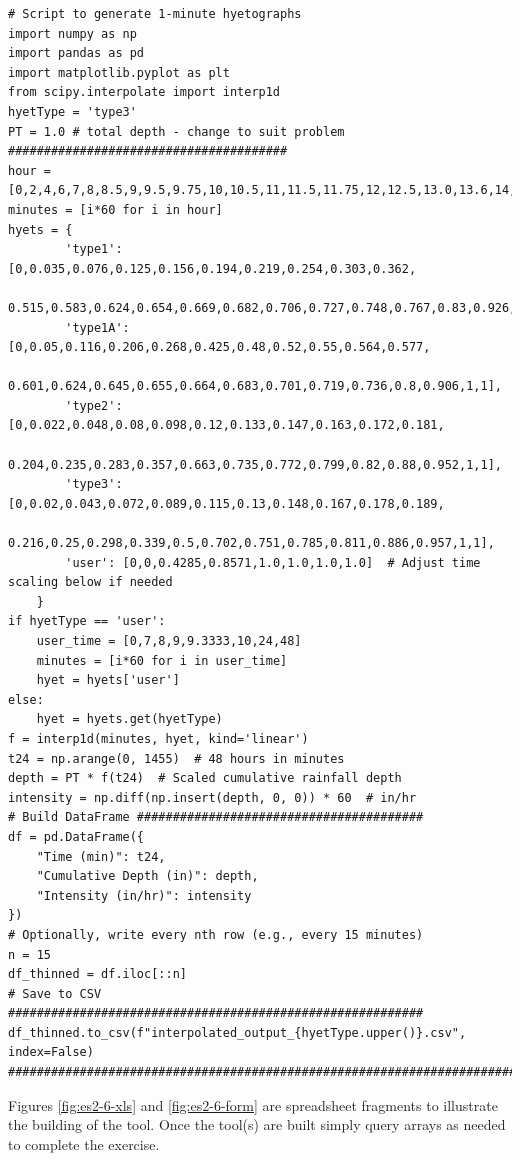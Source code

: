 \documentclass[12pt]{article}
\begin{document}
\begin{enumerate}
\begin{verbatim}
# Script to generate 1-minute hyetographs
import numpy as np
import pandas as pd
import matplotlib.pyplot as plt
from scipy.interpolate import interp1d
hyetType = 'type3'
PT = 1.0 # total depth - change to suit problem
#######################################
hour = [0,2,4,6,7,8,8.5,9,9.5,9.75,10,10.5,11,11.5,11.75,12,12.5,13.0,13.6,14,16,20,24,48]
minutes = [i*60 for i in hour]
hyets = {
        'type1': [0,0.035,0.076,0.125,0.156,0.194,0.219,0.254,0.303,0.362,
        0.515,0.583,0.624,0.654,0.669,0.682,0.706,0.727,0.748,0.767,0.83,0.926,1,1],
        'type1A': [0,0.05,0.116,0.206,0.268,0.425,0.48,0.52,0.55,0.564,0.577,
        0.601,0.624,0.645,0.655,0.664,0.683,0.701,0.719,0.736,0.8,0.906,1,1],
        'type2': [0,0.022,0.048,0.08,0.098,0.12,0.133,0.147,0.163,0.172,0.181,
        0.204,0.235,0.283,0.357,0.663,0.735,0.772,0.799,0.82,0.88,0.952,1,1],
        'type3': [0,0.02,0.043,0.072,0.089,0.115,0.13,0.148,0.167,0.178,0.189,
        0.216,0.25,0.298,0.339,0.5,0.702,0.751,0.785,0.811,0.886,0.957,1,1],
        'user': [0,0,0.4285,0.8571,1.0,1.0,1.0,1.0]  # Adjust time scaling below if needed
    }
if hyetType == 'user':
    user_time = [0,7,8,9,9.3333,10,24,48]
    minutes = [i*60 for i in user_time]
    hyet = hyets['user']
else:
    hyet = hyets.get(hyetType)
f = interp1d(minutes, hyet, kind='linear')
t24 = np.arange(0, 1455)  # 48 hours in minutes
depth = PT * f(t24)  # Scaled cumulative rainfall depth
intensity = np.diff(np.insert(depth, 0, 0)) * 60  # in/hr
# Build DataFrame ########################################
df = pd.DataFrame({
    "Time (min)": t24,
    "Cumulative Depth (in)": depth,
    "Intensity (in/hr)": intensity
})
# Optionally, write every nth row (e.g., every 15 minutes)
n = 15
df_thinned = df.iloc[::n]
# Save to CSV ##########################################################
df_thinned.to_csv(f"interpolated_output_{hyetType.upper()}.csv", index=False)
##########################################################################
\end{verbatim}

Figures \ref{fig:es2-6-xls} and \ref{fig:es2-6-form} are spreadsheet fragments to illustrate the building of the tool. Once the tool(s) are built simply query arrays as needed to complete the exercise.


\end{enumerate}
\end{document}
